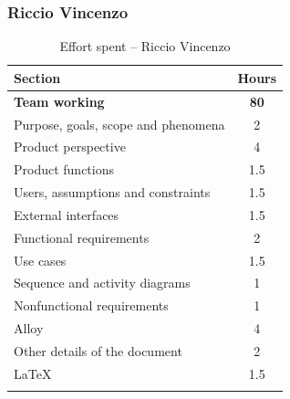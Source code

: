 \documentclass[a4paper,oneside,11pt]{book}   %
\begin{document}
    \subsubsection{Riccio Vincenzo}
    \begin{longtable}[c]{|H{.55\textwidth}|c|}
        \hline
        \textbf{Section} & {\bfseries{Hours}} \\ \hline
        \textbf{Team working} & \textbf{80} \\ \hline
        Purpose, goals, scope and phenomena & 2 \\ \hline
        Product perspective & 4 \\ \hline
        Product functions & 1.5 \\ \hline
        Users, assumptions and constraints & 1.5 \\ \hline
        External interfaces & 1.5 \\ \hline
        Functional requirements & 2 \\ \hline
        Use cases & 1.5 \\ \hline
        Sequence and activity diagrams & 1 \\ \hline
        Nonfunctional requirements & 1 \\ \hline
        Alloy & 4 \\ \hline
        Other details of the document & 2 \\ \hline
        \LaTeX & 1.5 \\
        \hline
        \caption{Effort spent -- Riccio Vincenzo}
        \label{table:effort_riccio}
    \end{longtable}
    
\end{document}
